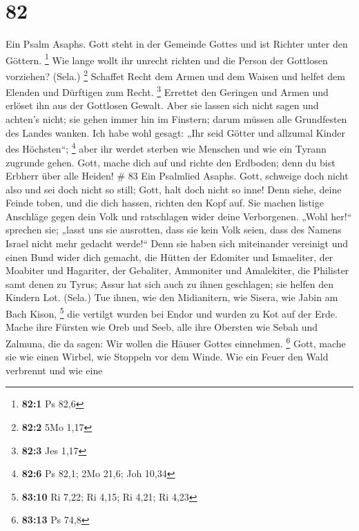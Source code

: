 \hypertarget{section-27}{%
\section{82}\label{section-27}}

 Ein Psalm Asaphs. Gott steht in der Gemeinde Gottes und ist
Richter unter den Göttern. \footnote{\textbf{82:1} Ps 82,6} 
Wie lange wollt ihr unrecht richten und die Person der Gottlosen
vorziehen? (Sela.) \footnote{\textbf{82:2} 5Mo 1,17} 
Schaffet Recht dem Armen und dem Waisen und helfet dem Elenden und
Dürftigen zum Recht. \footnote{\textbf{82:3} Jes 1,17} 
Errettet den Geringen und Armen und erlöset ihn aus der Gottlosen
Gewalt.  Aber sie lassen sich nicht sagen und achten's
nicht; sie gehen immer hin im Finstern; darum müssen alle Grundfesten
des Landes wanken.  Ich habe wohl gesagt: „Ihr seid Götter
und allzumal Kinder des Höchsten``; \footnote{\textbf{82:6} Ps 82,1; 2Mo
  21,6; Joh 10,34}  aber ihr werdet sterben wie Menschen und
wie ein Tyrann zugrunde gehen.  Gott, mache dich auf und
richte den Erdboden; denn du bist Erbherr über alle Heiden! \# 83
 Ein Psalmlied Asaphs.  Gott, schweige doch
nicht also und sei doch nicht so still; Gott, halt doch nicht so inne!
 Denn siehe, deine Feinde toben, und die dich hassen,
richten den Kopf auf.  Sie machen listige Anschläge gegen
dein Volk und ratschlagen wider deine Verborgenen.  „Wohl
her!{}`` sprechen sie; „lasst uns sie ausrotten, dass sie kein Volk
seien, dass des Namens Israel nicht mehr gedacht werde!{}`` 
Denn sie haben sich miteinander vereinigt und einen Bund wider dich
gemacht,  die Hütten der Edomiter und Ismaeliter, der
Moabiter und Hagariter,  der Gebaliter, Ammoniter und
Amalekiter, die Philister samt denen zu Tyrus;  Assur hat
sich auch zu ihnen geschlagen; sie helfen den Kindern Lot. (Sela.)
 Tue ihnen, wie den Midianitern, wie Sisera, wie Jabin am
Bach Kison, \footnote{\textbf{83:10} Ri 7,22; Ri 4,15; Ri 4,21; Ri 4,23}
 die vertilgt wurden bei Endor und wurden zu Kot auf der
Erde.  Mache ihre Fürsten wie Oreb und Seeb, alle ihre
Obersten wie Sebah und Zalmuna,  die da sagen: Wir wollen
die Häuser Gottes einnehmen. \footnote{\textbf{83:13} Ps 74,8}
 Gott, mache sie wie einen Wirbel, wie Stoppeln vor dem
Winde.  Wie ein Feuer den Wald verbrennt und wie eine
